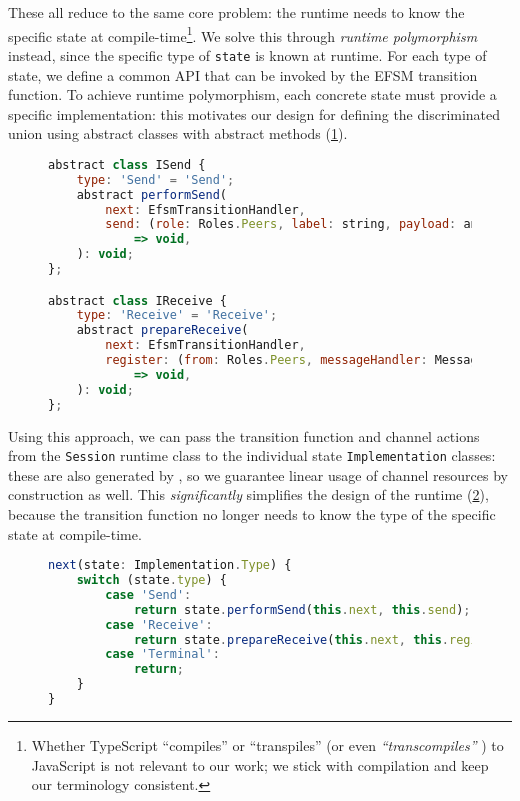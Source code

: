 These all reduce to the same core problem: the runtime
needs to know the specific state at compile-time\footnote{
Whether TypeScript ``compiles'' or ``transpiles''
(or even \textit{``transcompiles''} \cite{transcompiles}) to JavaScript
is not relevant to our work; we stick with compilation
and keep our terminology consistent.}.
We solve this through \textit{runtime polymorphism} instead, since
the specific type of \texttt{state} is known at runtime.
For each type of state, we define a common API that can be invoked
by the EFSM transition function. To achieve runtime polymorphism,
each concrete state must provide a specific implementation: 
this motivates our design for defining the discriminated union
using abstract classes with abstract methods 
(\cref{lst:nodeabstractclass}).

\begin{figure}[!h]
\begin{lstlisting}[language=javascript,tabsize=2]
abstract class ISend {
	type: 'Send' = 'Send';
	abstract performSend(
		next: EfsmTransitionHandler,
		send: (role: Roles.Peers, label: string, payload: any[]) 
			=> void,
	): void;
};

abstract class IReceive {
	type: 'Receive' = 'Receive';
	abstract prepareReceive(
		next: EfsmTransitionHandler,
		register: (from: Roles.Peers, messageHandler: MessageHandler)
			=> void,
	): void;
};
\end{lstlisting}
\label{lst:nodeabstractclass}
\end{figure}

Using this approach,
we can pass the transition function and channel actions 
from the \texttt{Session} runtime class
to the individual state \texttt{Implementation} classes:
these are also generated by , so we
guarantee linear usage of channel resources by construction as well.
This \textit{significantly} simplifies the design of the runtime
(\cref{lst:noderuntime}),
because the transition function no longer needs to know the type 
of the specific state at compile-time.

\begin{figure}[!h]
\begin{lstlisting}[language=javascript,tabsize=2]
next(state: Implementation.Type) {
	switch (state.type) {
		case 'Send':
			return state.performSend(this.next, this.send);
		case 'Receive':
			return state.prepareReceive(this.next, this.register);
		case 'Terminal':
			return;
	}
}
\end{lstlisting}
\label{lst:noderuntime}
\end{figure}

